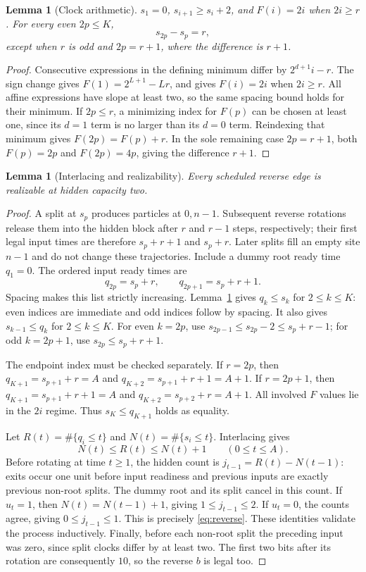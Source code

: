 \documentclass[11pt]{article}
\newtheorem{lemma}[theorem]{Lemma}
\begin{document}
\begin{lemma}[Clock arithmetic]\label{lem:clock}
$s_1=0$, $s_{i+1}\ge s_i+2$, and $F(i)=2i$ when $2i\ge r$.
For every even $2p\le K$,
\[
s_{2p}-s_p=r,
\]
except when $r$ is odd and $2p=r+1$, where the difference is $r+1$.
\end{lemma}
\begin{proof}
Consecutive expressions in the defining minimum differ by $2^{d+1}i-r$.
The sign change gives $F(1)=2^{L+1}-Lr$, and gives $F(i)=2i$ when
$2i\ge r$. All affine expressions have slope at least two, so the same
spacing bound holds for their minimum. If $2p\le r$, a minimizing index
for $F(p)$ can be chosen at least one, since its $d=1$ term is no larger
than its $d=0$ term. Reindexing that minimum gives $F(2p)=F(p)+r$.
In the sole remaining case $2p=r+1$, both $F(p)=2p$ and $F(2p)=4p$,
giving the difference $r+1$.
\end{proof}

\begin{lemma}[Interlacing and realizability]\label{lem:buffer}
Every scheduled reverse edge is realizable at hidden capacity two.
\end{lemma}
\begin{proof}
A split at $s_p$ produces particles at $0,n-1$. Subsequent reverse
rotations release them into the hidden block after $r$ and $r-1$ steps,
respectively; their first legal input times are therefore $s_p+r+1$ and
$s_p+r$. Later splits fill an empty site $n-1$ and do not change these
trajectories. Include a dummy root ready time $q_1=0$. The ordered input
ready times are
\[
q_{2p}=s_p+r,\qquad q_{2p+1}=s_p+r+1.
\]
Spacing makes this list strictly increasing. Lemma~\ref{lem:clock} gives
$q_k\le s_k$ for $2\le k\le K$: even indices are immediate and odd
indices follow by spacing. It also gives $s_{k-1}\le q_k$ for
$2\le k\le K$. For even $k=2p$, use
$s_{2p-1}\le s_{2p}-2\le s_p+r-1$; for odd $k=2p+1$, use
$s_{2p}\le s_p+r+1$.

The endpoint index must be checked separately. If $r=2p$, then
$q_{K+1}=s_{p+1}+r=A$ and $q_{K+2}=s_{p+1}+r+1=A+1$.
If $r=2p+1$, then $q_{K+1}=s_{p+1}+r+1=A$ and
$q_{K+2}=s_{p+2}+r=A+1$. All involved $F$ values lie in the $2i$ regime.
Thus $s_K\le q_{K+1}$ holds as equality.

Let $R(t)=\#\{q_i\le t\}$ and $N(t)=\#\{s_i\le t\}$. Interlacing gives
\[
N(t)\le R(t)\le N(t)+1\qquad(0\le t\le A).
\]
Before rotating at time $t\ge1$, the hidden count is
$j_{t-1}=R(t)-N(t-1)$: exits occur one unit before input readiness and
previous inputs are exactly previous non-root splits. The dummy root and
its split cancel in this count. If $u_t=1$, then
$N(t)=N(t-1)+1$, giving $1\le j_{t-1}\le2$. If $u_t=0$, the counts
agree, giving $0\le j_{t-1}\le1$. This is precisely
\eqref{eq:reverse}. These identities validate the process inductively.
Finally, before each non-root split the preceding input was zero, since
split clocks differ by at least two. The first two bits after its rotation
are consequently $10$, so the reverse $b$ is legal too.
\end{proof}
\end{document}
